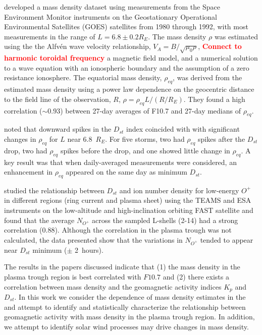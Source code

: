 \documentclass[10pt,twocolumn]{article}
\newcommand{\vinote}[1]{\textcolor{red}{\textbf{#1}}} %
\newcommand{\inote}[1]{\textcolor{blue}{\textbf{#1}}} %
\def\note#1\par{\textcolor{blue}{\textbf{#1}}\\}
\begin{document}
\cite{Takahashi2010} developed a mass density dataset using measurements from the Space Environment Monitor instruments on the Geostationary Operational Environmental Satellites (GOES) satellites from 1980 through 1992, with most measurements in the range of $L=6.8\pm0.2 R_E$. The mass density $\rho$ was estimated using the the Alfv\'en wave velocity relationship, $V_A=B/\sqrt{\mu_0\rho}$, \vinote{Connect to harmonic toroidal frequency} a magnetic field model, and a numerical solution to a wave equation with an ionospheric boundary and the assumption of a zero resistance ionosphere.  The equatorial mass density, $\rho_{eq}$, was derived from the estimated mass density using a power law dependence on the geocentric distance to the field line of the observation, $R$, $\rho=\rho_{eq}L/(R/R_E)$.  They found a high correlation ($\sim 0.93$) between 27-day averages of F10.7 and 27-day medians of $\rho_{eq}$.

\cite{Takahashi2010} noted that downward spikes in the $D_{st}$ index coincided with with significant changes in $\rho_{eq}$ for $L$ near 6.8~$R_E$. For five storms, two had $\rho_{eq}$ spikes after the $D_{st}$ drop, two had $\rho_{eq}$ spikes before the drop, and one showed little change in $\rho_{eq}$.  A key result was that when daily-averaged measurements were considered, an enhancement in $\rho_{eq}$ appeared on the same day as minimum $D_{st}$.

\cite{Yao2008} studied the relationship between $D_{st}$ and ion number density for low-energy $O^+$ in different regions (ring current and plasma sheet) using the TEAMS and ESA instruments on the low-altitude and high-inclination orbiting FAST satellite and found that the average $N_{O^+}$ across the sampled L-shells (2-14) had a strong correlation (0.88).  Although the correlation in the plasma trough was not calculated, the data presented show that the variations in $N_{O^+}$ tended to appear near $D_{st}$ minimum ($\pm$ 2~hours).

The results in the papers discussed indicate that (1) the mass density in the plasma trough region is best correlated with $F10.7$ and (2) there exists a correlation between mass density and the geomagnetic activity indices $K_p$ and $D_{st}$.  In this work we consider the dependence of mass density estimates in the \cite{Takahashi2010} and attempt to identify and statistically characterize the relationship between geomagnetic activity with mass density in the plasma trough region.  In addition, we attempt to identify solar wind processes may drive changes in mass density. 
\end{document}
